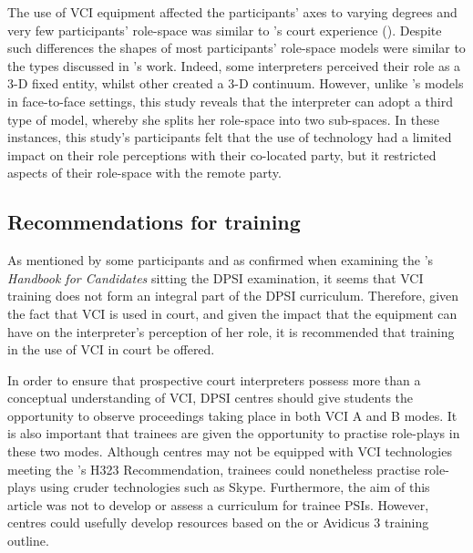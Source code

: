 \documentclass[output=paper]{langsci/langscibook}
\begin{document}
The use of \textsc{VCI} equipment affected the participants’ axes to varying degrees and very few participants’ role-space was similar to \citet{Llewellyn-Jones2014}’s court experience (). Despite such differences the shapes of most participants’ role-space models were similar to the types discussed in \citet{Llewellyn-Jones2014}’s work. Indeed, some interpreters perceived their role as a 3-D fixed entity, whilst other created a 3-D continuum. However, unlike \citet{Llewellyn-Jones2014}’s models in face-to-face settings, this study reveals that the interpreter can adopt a third type of model, whereby she splits her role-space into two sub-spaces. In these instances, this study’s participants felt that the use of technology had a limited impact on their role perceptions with their co-located party, but it restricted aspects of their role-space with the remote party. 

\subsection{Recommendations for training}
As mentioned by some participants and as confirmed when examining the \citet{IoL2015}’s \textit{Handbook for Candidates} sitting the \textsc{DPSI} examination, it seems that \textsc{VCI} training does not form an integral part of the \textsc{DPSI} curriculum. Therefore, given the fact that \textsc{VCI} is used in court, and given the impact that the equipment can have on the interpreter’s perception of her role, it is recommended that training in the use of \textsc{VCI} in court be offered.  

In order to ensure that prospective court interpreters possess more than a conceptual understanding of \textsc{VCI}, \textsc{DPSI} centres should give students the opportunity to observe proceedings taking place in both \textsc{VCI} A and B modes. It is also important that trainees are given the opportunity to practise role-plays in these two modes. Although centres may not be equipped with \textsc{VCI} technologies meeting the \citet{TelecommunicationUnion2009}’s H323 Recommendation, trainees could nonetheless practise role-plays using cruder technologies such as Skype. Furthermore, the aim of this article was not to develop or assess a curriculum for trainee PSIs. However, centres could usefully develop resources based on the \citet{Braun2011c} or Avidicus 3 training outline. 
\end{document}
